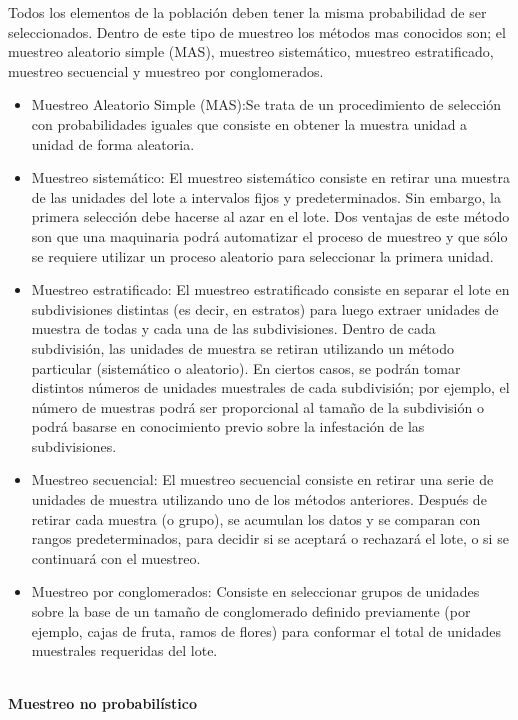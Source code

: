 Todos los elementos de la poblaci\'{o}n deben tener la misma probabilidad de ser seleccionados. Dentro de este tipo de muestreo los m\'{e}todos mas conocidos son; el muestreo aleatorio simple (MAS), muestreo sistem\'{a}tico, muestreo estratificado, muestreo secuencial y muestreo por conglomerados.
\begin{itemize}
\item Muestreo Aleatorio Simple (MAS):Se trata de un procedimiento de selecci\'{o}n con probabilidades iguales que consiste en obtener la muestra unidad a unidad de forma aleatoria.\cite{M}
\item Muestreo sistem\'{a}tico: El muestreo sistem\'{a}tico consiste en retirar una muestra de las unidades del lote a intervalos fijos y predeterminados. Sin embargo, la primera selecci\'{o}n debe hacerse al azar en el lote. Dos ventajas de este m\'{e}todo son que una maquinaria podr\'{a} automatizar el proceso de muestreo y que s\'{o}lo se requiere utilizar un proceso aleatorio para seleccionar la primera unidad.\cite{MUES}
\item Muestreo estratificado: El muestreo estratificado consiste en separar el lote en subdivisiones distintas (es decir, en estratos) para luego extraer
unidades de muestra de todas y cada una de las subdivisiones. Dentro de cada subdivisi\'{o}n, las unidades de muestra se retiran utilizando un m\'{e}todo particular (sistem\'{a}tico o aleatorio). En ciertos casos, se podr\'{a}n tomar distintos n\'{u}meros de unidades muestrales de cada subdivisi\'{o}n; por ejemplo, el n\'{u}mero de muestras podr\'{a} ser proporcional al tama\~{n}o de la subdivisi\'{o}n o podr\'{a} basarse en conocimiento previo sobre la infestaci\'{o}n de las subdivisiones.\cite{MUES}
\item Muestreo secuencial: El muestreo secuencial consiste en retirar una serie de unidades de muestra utilizando uno de los m\'{e}todos anteriores. Despu\'{e}s de retirar cada muestra (o grupo), se acumulan los datos y se comparan con rangos predeterminados, para decidir si se aceptar\'{a} o rechazar\'{a} el lote, o si se continuar\'{a} con el muestreo.\cite{MUES}
\item Muestreo por conglomerados: Consiste en seleccionar grupos de unidades sobre la base de un tama\~{n}o de conglomerado definido previamente (por ejemplo, cajas de fruta, ramos de flores) para conformar el total de unidades muestrales requeridas del lote.\cite{MUES}
\end{itemize}

~\\\textbf{Muestreo no probabil\'{i}stico} 

